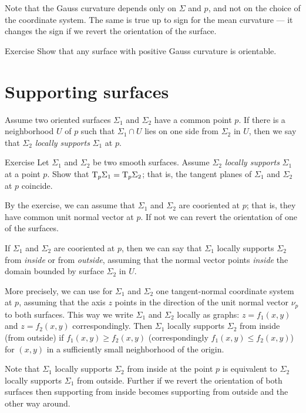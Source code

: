 Note that the Gauss curvature depends only on $\Sigma$ and $p$,
and not on the choice of the coordinate system.
The same is true up to sign for the mean curvature --- it changes the sign if we revert the orientation of the surface.

\begin{thm}{Exercise}\label{ex:gauss+orientable}
Show that any surface with positive Gauss curvature is orientable. 
\end{thm}


\section*{Supporting surfaces}

Assume two oriented surfaces $\Sigma_1$ and $\Sigma_2$ have a common point $p$.
If there is a neighborhood $U$ of $p$ such that $\Sigma_1\cap U$ lies on one side from $\Sigma_2$ in $U$, then we say that $\Sigma_2$ \emph{locally supports} $\Sigma_1$ at $p$.

\begin{thm}{Exercise}\label{ex:T=T}
Let $\Sigma_1$ and $\Sigma_2$ be two smooth surfaces.
Assume $\Sigma_2$ \emph{locally supports} $\Sigma_1$ at a point $p$.
Show that $\mathrm{T}_p\Sigma_1=\mathrm{T}_p\Sigma_2$;
that is, the tangent planes of $\Sigma_1$ and $\Sigma_2$ at $p$ coincide.
\end{thm}

By the exercise, we can assume that $\Sigma_1$ and $\Sigma_2$ are cooriented at $p$;
that is, they have common unit normal vector at $p$.
If not we can revert the orientation of one of the surfaces.

If $\Sigma_1$ and $\Sigma_2$ are cooriented at $p$,
then we can say that $\Sigma_1$ locally supports $\Sigma_2$ from \emph{inside} or from \emph{outside},
assuming that the normal vector points \emph{inside} the domain bounded by surface $\Sigma_2$ in $U$.

More precisely, we can use for $\Sigma_1$ and $\Sigma_2$ one tangent-normal coordinate system at $p$,
assuming that the axis $z$ points in the direction of the unit normal vector $\nu_p$ to both surfaces.
This way we write $\Sigma_1$ and $\Sigma_2$ locally as graphs: $z=f_1(x,y)$  and $z=f_2(x,y)$ correspondingly.
Then $\Sigma_1$ locally supports $\Sigma_2$ from inside (from outside)  if $f_1(x,y)\ge f_2(x,y)$ (correspondingly $f_1(x,y)\le f_2(x,y)$) for $(x,y)$ in a sufficiently small neighborhood of the origin.

Note that $\Sigma_1$ locally supports $\Sigma_2$ from inside at the point $p$ is equivalent to $\Sigma_2$ locally supports $\Sigma_1$ from outside.
Further if we revert the orientation of both surfaces then supporting from inside becomes supporting from outside and the other way around.


